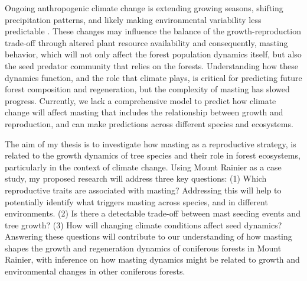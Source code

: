 \documentclass[11pt,letter]{article}
\begin{document}
Ongoing anthropogenic climate change is extending growing seasons, shifting precipitation patterns, and likely making environmental variability less predictable  \citep{calvin2023ipcc}. These changes may influence the balance of the growth-reproduction trade-off through altered plant resource availability and consequently, masting behavior, which will not only affect the forest population dynamics itself, but also the seed predator community that relies on the forests. Understanding how these dynamics function, and the role that climate plays, is critical for predicting future forest composition and regeneration, but the complexity of masting has slowed progress. Currently, we lack a comprehensive model to predict how climate change will affect masting that includes the relationship between growth and reproduction, and can make predictions across different species and ecosystems.\par

The aim of my thesis is to investigate how masting as a reproductive strategy, is related to the growth dynamics of tree species and their role in forest ecosystems, particularly in the context of climate change. Using Mount Rainier as a case study, my proposed research will address three key questions: (1) Which reproductive traits are associated with masting? Addressing this will help to potentially identify what triggers masting across species, and in different environments. (2) Is there a detectable trade-off between mast seeding events and tree growth? (3) How will changing climate conditions affect seed dynamics? Answering these questions will contribute to our understanding of how masting shapes the growth and regeneration dynamics of coniferous forests in Mount Rainier, with inference on how masting dynamics might be related to growth and environmental changes in other coniferous forests.\par
\end{document}
